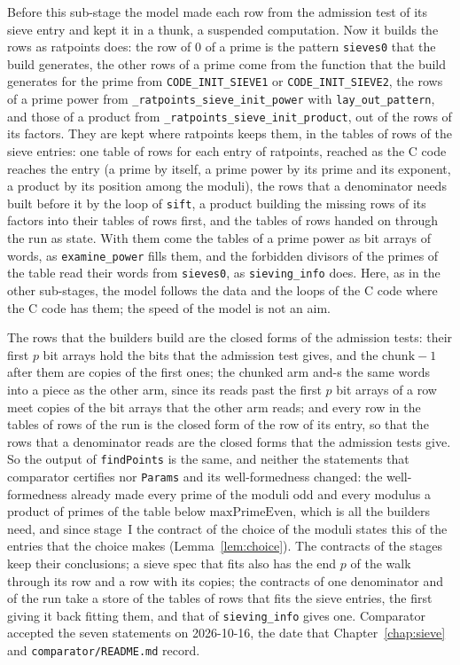 Before this sub-stage the model made each row from the admission test of its sieve entry and kept
it in a thunk, a suspended computation. Now it builds the rows as ratpoints does: the row of $0$ of
a prime is the pattern \verb|sieves0| that the build generates, the other rows of a prime come from
the function that the build generates for the prime from \verb|CODE_INIT_SIEVE1| or
\verb|CODE_INIT_SIEVE2|, the rows of a prime power from \verb|_ratpoints_sieve_init_power| with
\verb|lay_out_pattern|, and those of a product from \verb|_ratpoints_sieve_init_product|, out of the
rows of its factors. They are kept where ratpoints keeps them, in the tables of rows of the sieve
entries: one table of rows for each entry of ratpoints, reached as the C code reaches the entry (a
prime by itself, a prime power by its prime and its exponent, a product by its position among the
moduli), the rows that a denominator needs built before it by the loop of \verb|sift|, a product
building the missing rows of its factors into their tables of rows first, and the tables of rows
handed on through the run as state. With them come the tables of a prime power as bit arrays of
words, as \verb|examine_power| fills them, and the forbidden divisors of the primes of the table
read their words from \verb|sieves0|, as \verb|sieving_info| does. Here, as in the other
sub-stages, the model follows the data and the loops of the C code where the C code has them; the
speed of the model is not an aim.

The rows that the builders build are the closed forms of the admission tests: their first $p$ bit
arrays hold the bits that the admission test gives, and the $\mathrm{chunk} - 1$ after them are
copies of the first ones; the chunked arm and-s the same words into a piece as the other arm, since
its reads past the first $p$ bit arrays of a row meet copies of the bit arrays that the other arm
reads; and every row in the tables of rows of the run is the closed form of the row of its entry, so
that the rows that a denominator reads are the closed forms that the admission tests give. So the
output of \verb|findPoints| is the same, and neither the statements that comparator certifies nor
\verb|Params| and its well-formedness changed: the well-formedness already made every prime of the
moduli odd and every modulus a product of primes of the table below $\mathrm{maxPrimeEven}$, which
is all the builders need, and since stage~I the contract of the choice of the moduli states this of
the entries that the choice makes (Lemma~\ref{lem:choice}). The contracts of the stages keep their
conclusions; a sieve spec that fits also has the end $p$ of the walk through its row and a row with
its copies; the contracts of one denominator and of the run take a store of the tables of rows that
fits the sieve entries, the first giving it back fitting them, and that of \verb|sieving_info| gives
one. Comparator accepted the seven statements on 2026-10-16, the date that Chapter~\ref{chap:sieve}
and \verb|comparator/README.md| record.


